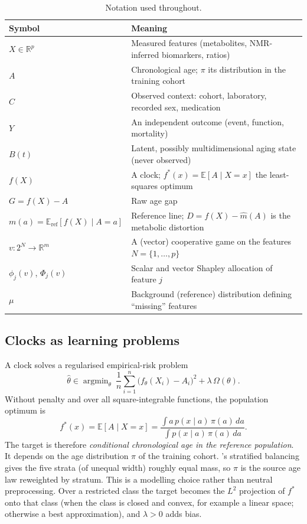 \documentclass[11pt,a4paper]{article}
\theoremstyle{plain}
\theoremstyle{definition}
\theoremstyle{remark}
\newcommand{\E}{\mathbb{E}}
\newcommand{\R}{\mathbb{R}}
\DeclareMathOperator*{\argmin}{argmin}
\begin{document}
\begin{table}[h]
\centering\small
\begin{tabularx}{\linewidth}{@{}lX@{}}
\toprule
Symbol & Meaning\\
\midrule
$X\in\R^p$ & Measured features (metabolites, NMR-inferred biomarkers, ratios)\\
$A$ & Chronological age; $\pi$ its distribution in the training cohort\\
$C$ & Observed context: cohort, laboratory, recorded sex, medication\\
$Y$ & An independent outcome (event, function, mortality)\\
$B(t)$ & Latent, possibly multidimensional aging state (never observed)\\
$f(X)$ & A clock; $f^*(x)=\E[A\mid X=x]$ the least-squares optimum\\
$G=f(X)-A$ & Raw age gap\\
$m(a)=\E_{\mathrm{ref}}[f(X)\mid A=a]$ & Reference line; $D=f(X)-\widehat m(A)$ is the metabolic distortion\\
$v:2^N\to\R^m$ & A (vector) cooperative game on the features $N=\{1,\dots,p\}$\\
$\phi_j(v)$, $\Phi_j(v)$ & Scalar and vector Shapley allocation of feature $j$\\
$\mu$ & Background (reference) distribution defining ``missing'' features\\
\bottomrule
\end{tabularx}
\caption{Notation used throughout.}
\end{table}

\subsection{Clocks as learning problems}
A clock solves a regularised empirical-risk problem
\begin{equation}\label{eq:erm}
\widehat\theta\in\argmin_\theta\ \frac1n\sum_{i=1}^n\big(f_\theta(X_i)-A_i\big)^2+\lambda\,\Omega(\theta).
\end{equation}
Without penalty and over all square-integrable functions, the population optimum is
\begin{equation}\label{eq:fstar}
f^*(x)=\E[A\mid X=x]=\frac{\int a\,p(x\mid a)\,\pi(a)\,da}{\int p(x\mid a)\,\pi(a)\,da}.
\end{equation}
The target is therefore \emph{conditional chronological age in the reference population}. It depends on the age distribution $\pi$ of the training cohort. \PI's stratified balancing gives the five strata (of unequal width) roughly equal mass, so $\pi$ is the source age law reweighted by stratum. This is a modelling choice rather than neutral preprocessing. Over a restricted class the target becomes the $L^2$ projection of $f^*$ onto that class (when the class is closed and convex, for example a linear space; otherwise a best approximation), and $\lambda>0$ adds bias.
\end{document}
